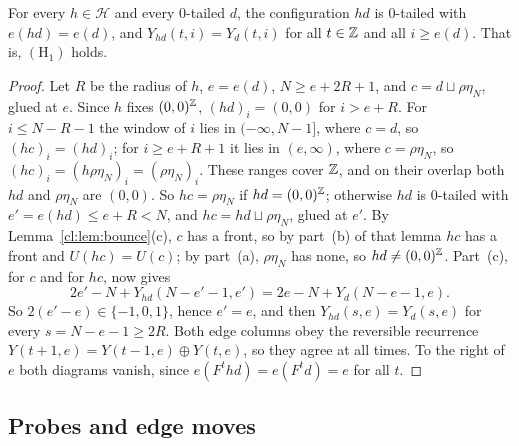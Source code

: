

\begin{proposition}[$(\mathrm H_1)$]\label{cl:prop:H1}
For every $h\in\mathcal H$ and every $0$-tailed $d$, the configuration $hd$ is $0$-tailed with $e(hd)=e(d)$, and $Y_{hd}(t,i)=Y_d(t,i)$ for all $t\in\mathbb{Z}$ and all $i\ge e(d)$. That is, $(\mathrm H_1)$ holds.
\end{proposition}

\begin{proof}
Let $R$ be the radius of $h$, $e=e(d)$, $N\ge e+2R+1$, and $c=d\sqcup\rho\eta_N$, glued at $e$. Since $h$ fixes $(0,0)^{\mathbb{Z}}$, $(hd)_i=(0,0)$ for $i>e+R$. For $i\le N-R-1$ the window of $i$ lies in $(-\infty,N-1]$, where $c=d$, so $(hc)_i=(hd)_i$; for $i\ge e+R+1$ it lies in $(e,\infty)$, where $c=\rho\eta_N$, so $(hc)_i=(h\rho\eta_N)_i=(\rho\eta_N)_i$. These ranges cover $\mathbb{Z}$, and on their overlap both $hd$ and $\rho\eta_N$ are $(0,0)$. So $hc=\rho\eta_N$ if $hd=(0,0)^{\mathbb{Z}}$; otherwise $hd$ is $0$-tailed with $e'=e(hd)\le e+R<N$, and $hc=hd\sqcup\rho\eta_N$, glued at $e'$. By Lemma~\ref{cl:lem:bounce}(c), $c$ has a front, so by part~(b) of that lemma $hc$ has a front and $U(hc)=U(c)$; by part~(a), $\rho\eta_N$ has none, so $hd\ne(0,0)^{\mathbb{Z}}$. Part~(c), for $c$ and for $hc$, now gives
\[
2e'-N+Y_{hd}(N-e'-1,e')=2e-N+Y_d(N-e-1,e).
\]
So $2(e'-e)\in\{-1,0,1\}$, hence $e'=e$, and then $Y_{hd}(s,e)=Y_d(s,e)$ for every $s=N-e-1\ge2R$. Both edge columns obey the reversible recurrence $Y(t+1,e)=Y(t-1,e)\oplus Y(t,e)$, so they agree at all times. To the right of $e$ both diagrams vanish, since $e(F^thd)=e(F^td)=e$ for all $t$.
\end{proof}

\subsection{Probes and edge moves}\label{cl:sec:probes}

